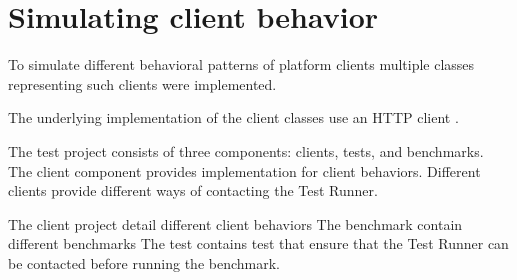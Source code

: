 
\section{Simulating client behavior}
To simulate different behavioral patterns of platform clients multiple classes representing such clients were implemented. 

The underlying implementation of the client classes use an HTTP client .



The test project consists of three components: clients, tests, and benchmarks.
The client component provides implementation for client behaviors. Different clients provide different ways of contacting the Test Runner.

The client project detail different client behaviors
The benchmark contain different benchmarks
The test contains test that ensure that the Test Runner can be contacted before running the benchmark.
